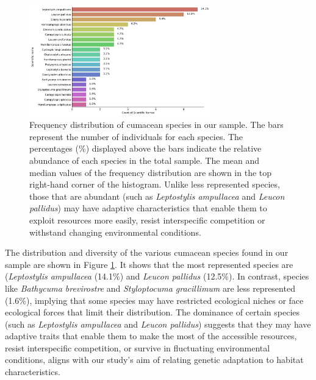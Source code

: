 \begin{figure}[htbp]
    \centering
    \includegraphics[width=0.7\textwidth]{figure2.jpg}
    \caption{Frequency distribution of cumacean species in our sample. The bars represent the number of individuals for each species. The percentages (\%) displayed above the bars indicate the relative abundance of each species in the total sample. The mean and median values of the frequency distribution are shown in the top right-hand corner of the histogram. Unlike less represented species, those that are abundant (such as \emph{Leptostylis ampullacea} and \emph{Leucon pallidus}) may have adaptive characteristics that enable them to exploit resources more easily, resist interspecific competition or withstand changing environmental conditions. \label{fig:fig3}}
\end{figure}

The distribution and diversity of the various cumacean species found in our sample are shown in Figure \ref{fig:fig3}. It shows that the most represented species are (\emph{Leptostylis ampullacea} (14.1\%) and \emph{Leucon pallidus} (12.5\%). In contrast, species like \emph{Bathycuma brevirostre} and \emph{Styloptocuma gracillimum} are less represented (1.6\%), implying that some species may have restricted ecological niches or face ecological forces that limit their distribution. The dominance of certain species (such as \emph{Leptostylis ampullacea} and \emph{Leucon pallidus}) suggests that they may have adaptive traits that enable them to make the most of the accessible resources, resist interspecific competition, or survive in fluctuating environmental conditions, aligns with our study’s aim of relating genetic adaptation to habitat characteristics. 

